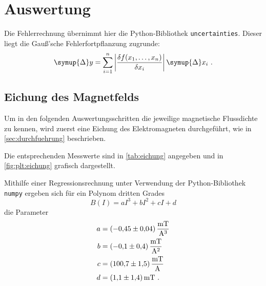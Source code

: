 \section{Auswertung}
\label{sec:auswertung}

Die Fehlerrechnung übernimmt hier die Python-Bibliothek \texttt{uncertainties}.
Dieser liegt die Gauß'sche Fehlerfortpflanzung zugrunde:
\begin{equation*}
    \symup{\Delta} y = \sum_{i=1}^n \left| \frac{\delta f(x_1, \ldots, x_n)}{\delta x_i} \right| \symup{\Delta} x_i \ .
\end{equation*}


\subsection{Eichung des Magnetfelds} \label{sec:auswertung:eichung}
Um in den folgenden Auswertungsschritten
die jeweilige magnetische Flussdichte zu kennen,
wird zuerst eine Eichung des Elektromagneten durchgeführt,
wie in \autoref{sec:durchfuehrung} beschrieben.

Die entsprechenden Messwerte sind in \autoref{tab:eichung} angegeben
und in \autoref{fig:plt:eichung} grafisch dargestellt.

Mithilfe einer Regressionsrechnung unter Verwendung der Python-Bibliothek \texttt{numpy} %
ergeben sich für ein Polynom dritten Grades
\[
    B(I) = aI^3 + bI^2 + cI + d
\]
die Parameter
\begin{align*}
    a &= \SI{-0.45 \pm 0.04}{\milli\tesla\per\cubic\ampere} \\
    b &= \SI{-0.1 \pm 0.4}{\milli\tesla\per\square\ampere} \\
    c &= \SI{100.7 \pm 1.5}{\milli\tesla\per\ampere} \\
    d &= \SI{1.1 \pm 1.4}{\milli\tesla} \ .
\end{align*}

